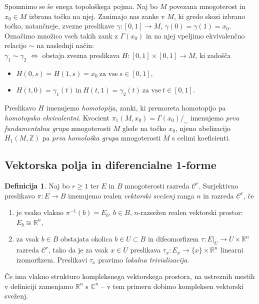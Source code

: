 \documentclass[12pt,a4paper,twoside]{article}
\theoremstyle{definition} %
\newtheorem{definicija}{Definicija}[section]
\theoremstyle{plain} %
\numberwithin{equation}{section}  %
\newcommand{\R}{\mathbb R}
\newcommand{\C}{\mathbb C}
\begin{document}
Spomnimo se še enega topološkega pojma. Naj bo $M$ povezana mnogoterost in $x_{0} \in M$ izbrana točka na njej. Zanimajo nas zanke v $M$, ki gredo skozi izbrano točko, natančneje, zvezne preslikave $\gamma \colon [0,1] \to M$, $\gamma(0) = \gamma(1) = x_{0}$. Označimo množico vseh takih zank z $\Gamma(x_{0})$ in na njej vpeljimo ekvivalenčno relacijo $\sim$ na naslednji način:\\[0.3cm]
$\gamma_{1} \sim \gamma_{2}$ $\iff$ obstaja zvezna preslikava $H \colon [0,1] \times [0,1] \to M$, ki zadošča 
\begin{itemize}
\item $H(0,s) = H(1,s) = x_{0} \ \text{za vse} \ s \in [0,1]$, 
\item $H(t,0) = \gamma_{1}(t) \ \text{in} \ H(t,1) = \gamma_{2}(t) \ \text{za vse} \ t \in [0,1]$.
\end{itemize}
Preslikavo $H$ imenujemo \emph{homotopija}, zanki, ki premoreta homotopijo pa \emph{homotopsko ekvivalentni}.
Kvocient $\pi_{1}(M,x_{0}) = \Gamma(x_{0}) / _{\sim}$ imenujemo \emph{prva fundamentalna grupa} mnogoterosti $M$ glede na točko $x_{0}$, njeno abelizacijo $H_{1}(M, \mathbb{Z})$ pa \emph{prva homološka grupa} mnogoterosti $M$ s celimi koeficienti.

\subsection{Vektorska polja in diferencialne 1-forme}
%
\begin{definicija}
Naj bo $r \geq 1$ ter $E$ in $B$ mnogoterosti razreda $\mathcal{C}^{r}$.
Surjektivno preslikavo $\pi \colon E \to B$ imenujemo realen \emph{vektorski sveženj} ranga $n$ in razreda $\mathcal{C}^{r}$, če
\begin{enumerate}
\item je vsako vlakno $\pi^{-1}(b) = E_{b}$, $b \in B$, $n$-razsežen realen vektorski prostor: $E_{b} \cong \R^{n}$,
\item za vsak $b \in B$ obstajata okolica $b \in U \subset B$ in difeomorfizem $\tau \colon E|_{U} \to U \times \R^{n}$ razreda $\mathcal{C}^{r}$, tako da je za vsak $x \in U$ preslikava $ \tau_{x} \colon E_{x} \to \{x\} \times \R^{n} $ linearni izomorfizem. Preslikavi $\tau_{x}$ pravimo \emph{lokalna trivializacija}.
\end{enumerate}
Če ima vlakno strukturo kompleksnega vektorskega prostora, na ustreznih mestih v definiciji zamenjamo $\R^{n}$ s $\C^{n}$ -- v tem primeru dobimo kompleksen vektorski sveženj.
\end{definicija}
\end{document}
